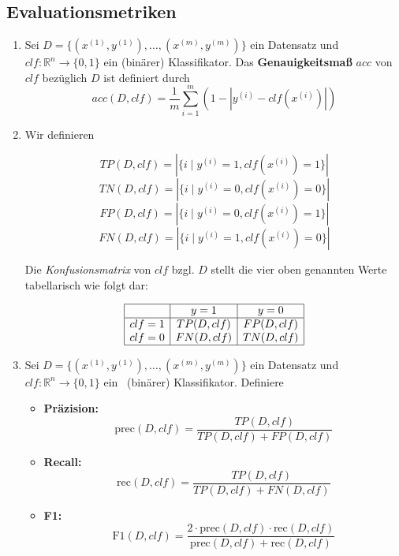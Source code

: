 \documentclass[researchlab,palatino]{AIGpaper}
\begin{document}
\subsection{Evaluationsmetriken}
\begin{enumerate}
    \item 
Sei $D = \{(x^{(1)}, y^{(1)}), \dots, (x^{(m)}, y^{(m)})\}$ ein Datensatz und $clf: \mathbb{R}^n \to \{0, 1\}$ ein (binärer) Klassifikator. Das \textbf{Genauigkeitsmaß} $acc$ von $clf$ bezüglich $D$ ist definiert durch
\begin{equation}
    acc(D, clf) = \frac{1}{m} \sum_{i=1}^{m} \left(1 - \left|y^{(i)} - clf(x^{(i)})\right|\right)
\end{equation}
    
\item 
Wir definieren

\begin{equation}
    TP(D, clf) = |\{i \mid y^{(i)} = 1, clf(x^{(i)}) = 1\}|
\end{equation}
\begin{equation}
    TN(D, clf) = |\{i \mid y^{(i)} = 0, clf(x^{(i)}) = 0\}|
\end{equation}
\begin{equation}
    FP(D, clf) = |\{i \mid y^{(i)} = 0, clf(x^{(i)}) = 1\}|
\end{equation}
\begin{equation}
    FN(D, clf) = |\{i \mid y^{(i)} = 1, clf(x^{(i)}) = 0\}|
\end{equation}

Die \textit{Konfusionsmatrix} von $clf$ bzgl. $D$ stellt die vier oben genannten Werte tabellarisch wie folgt dar:

\[
\begin{array}{|c|c|c|}
\hline
 & y = 1 & y = 0 \\
\hline
clf = 1 & TP(D, clf) & FP(D, clf) \\
clf = 0 & FN(D, clf) & TN(D, clf) \\
\hline
\end{array}
\]
\item
Sei $D = \{(x^{(1)}, y^{(1)}), \dots, (x^{(m)}, y^{(m)})\}$ ein Datensatz und $clf: \mathbb{R}^n \to \{0, 1\}$ ein ~(binärer) Klassifikator. Definiere
\begin{itemize}
    \item \textbf{Präzision:}
    \begin{equation}
    \text{prec}(D, clf) = \frac{TP(D, clf)}{TP(D, clf) + FP(D, clf)}
     \end{equation}
    \item \textbf{Recall:}
 \begin{equation}
    \text{rec}(D, clf) = \frac{TP(D, clf)}{TP(D, clf) + FN(D, clf)}
    \end{equation}
    \item \textbf{F1:}
    \begin{equation}
    \text{F1}(D, clf) = \frac{2 \cdot \text{prec}(D, clf) \cdot \text{rec}(D, clf)}{\text{prec}(D, clf) + \text{rec}(D, clf)}
    \end{equation}
\end{itemize}
\end{enumerate}
\end{document}
